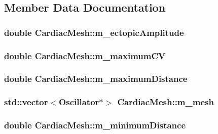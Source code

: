 \subsection{Member Data Documentation}
\hypertarget{class_cardiac_mesh_a4eeec3a9a09b9bc7e68ca3f7b34ea36c}{
\subsubsection[{m\+\_\+ectopic\+Amplitude}]{\setlength{\rightskip}{0pt plus 5cm}double Cardiac\+Mesh\+::m\+\_\+ectopic\+Amplitude}}\label{class_cardiac_mesh_a4eeec3a9a09b9bc7e68ca3f7b34ea36c}
\hypertarget{class_cardiac_mesh_a48ee051becaeae6be8d4d1b1569645d2}{
\subsubsection[{m\+\_\+maximum\+C\+V}]{\setlength{\rightskip}{0pt plus 5cm}double Cardiac\+Mesh\+::m\+\_\+maximum\+C\+V}}\label{class_cardiac_mesh_a48ee051becaeae6be8d4d1b1569645d2}
\hypertarget{class_cardiac_mesh_a05ed4402cf331198ee5021c65ac37e23}{
\subsubsection[{m\+\_\+maximum\+Distance}]{\setlength{\rightskip}{0pt plus 5cm}double Cardiac\+Mesh\+::m\+\_\+maximum\+Distance}}\label{class_cardiac_mesh_a05ed4402cf331198ee5021c65ac37e23}
\hypertarget{class_cardiac_mesh_acd49de8f8f878f45c927d4b75851ced6}{
\subsubsection[{m\+\_\+mesh}]{\setlength{\rightskip}{0pt plus 5cm}std\+::vector$<${\bf Oscillator}$\ast$$>$ Cardiac\+Mesh\+::m\+\_\+mesh}}\label{class_cardiac_mesh_acd49de8f8f878f45c927d4b75851ced6}
\hypertarget{class_cardiac_mesh_a100654a6bb2237fc09cef29c517818ad}{
\subsubsection[{m\+\_\+minimum\+Distance}]{\setlength{\rightskip}{0pt plus 5cm}double Cardiac\+Mesh\+::m\+\_\+minimum\+Distance}}\label{class_cardiac_mesh_a100654a6bb2237fc09cef29c517818ad}
